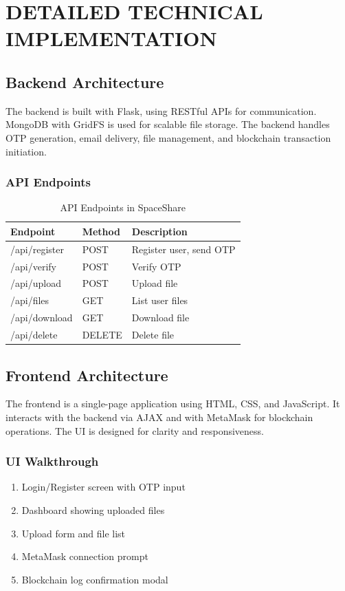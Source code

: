 \documentclass[a4paper, 12pt]{report}
\newenvironment{frontmatter}{}{}
\begin{document}
\begin{frontmatter}
\chapter{DETAILED TECHNICAL IMPLEMENTATION}
\section{Backend Architecture}
The backend is built with Flask, using RESTful APIs for communication. MongoDB with GridFS is used for scalable file storage. The backend handles OTP generation, email delivery, file management, and blockchain transaction initiation.

\subsection{API Endpoints}
\begin{longtable}{|l|l|l|}
\caption{API Endpoints in SpaceShare} \\
\hline
\textbf{Endpoint} & \textbf{Method} & \textbf{Description} \\
\hline
/api/register & POST & Register user, send OTP \\
\hline
/api/verify & POST & Verify OTP \\
\hline
/api/upload & POST & Upload file \\
\hline
/api/files & GET & List user files \\
\hline
/api/download & GET & Download file \\
\hline
/api/delete & DELETE & Delete file \\
\hline
\end{longtable}

\section{Frontend Architecture}
The frontend is a single-page application using HTML, CSS, and JavaScript. It interacts with the backend via AJAX and with MetaMask for blockchain operations. The UI is designed for clarity and responsiveness.

\subsection{UI Walkthrough}
\begin{enumerate}
    \item Login/Register screen with OTP input
    \item Dashboard showing uploaded files
    \item Upload form and file list
    \item MetaMask connection prompt
    \item Blockchain log confirmation modal
\end{enumerate}


\end{frontmatter}
\end{document}

